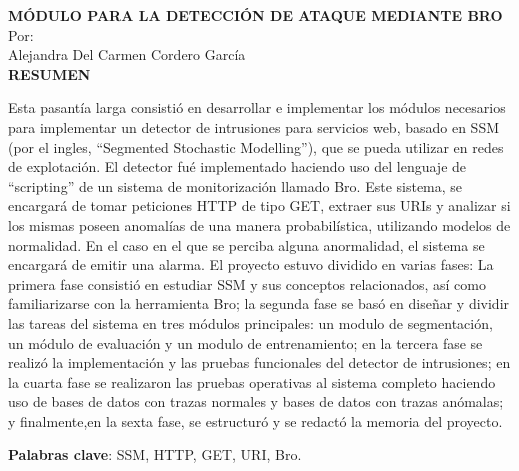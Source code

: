 \setcounter{page}{5}
\begin{center}

{\bfseries MÓDULO PARA LA DETECCIÓN DE
ATAQUE MEDIANTE BRO\\}
\bigskip
Por: \\ Alejandra Del Carmen Cordero García\\
\bigskip
\bigskip
{\bf RESUMEN}  %
\end{center}	

Esta pasantía larga consistió en desarrollar e implementar los
módulos necesarios para implementar un detector de intrusiones para servicios
web, basado en SSM (por el ingles, ``Segmented Stochastic Modelling'')\cite{ssm},
que se pueda utilizar en redes de explotación. El detector fué implementado
haciendo uso del lenguaje de ``scripting'' de un sistema de monitorización
llamado Bro. Este sistema, se encargará de tomar peticiones HTTP de tipo
GET, extraer sus URIs y analizar si los mismas poseen anomalías de una
manera probabilística, utilizando modelos de normalidad. En el caso en el
que se perciba alguna anormalidad, el sistema se encargará de emitir una
alarma.
El proyecto estuvo dividido en varias fases: La primera fase consistió en
estudiar SSM y sus conceptos relacionados, así como familiarizarse con la
herramienta Bro; la segunda fase se basó en diseñar y dividir las tareas del
sistema en tres módulos principales: un modulo de segmentación, un módulo
de evaluación y un modulo de entrenamiento; en la tercera fase se realizó la
implementación y las pruebas funcionales del detector de intrusiones; en la
cuarta fase se realizaron las pruebas operativas al sistema completo haciendo
uso de bases de datos con trazas normales y bases de datos con trazas
anómalas; y finalmente,en la sexta fase, se estructuró y se redactó la memoria
del proyecto.

\textbf{Palabras clave}: SSM, HTTP, GET, URI, Bro.
 